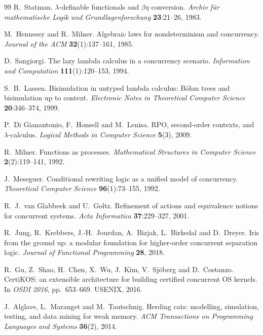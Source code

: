 \documentclass[11pt]{article}
\theoremstyle{plain}
\theoremstyle{definition}
\theoremstyle{remark}
\begin{document}
\begin{thebibliography}{99}
 R.~Statman.
\newblock $\lambda$-definable functionals and $\beta\eta$ conversion.
\newblock \emph{Archiv f\"ur mathematische Logik und Grundlagenforschung}
\textbf{23}:21--26, 1983.

 M.~Hennessy and R.~Milner.
\newblock Algebraic laws for nondeterminism and concurrency.
\newblock \emph{Journal of the ACM} \textbf{32}(1):137--161, 1985.

 D.~Sangiorgi.
\newblock The lazy lambda calculus in a concurrency scenario.
\newblock \emph{Information and Computation} \textbf{111}(1):120--153, 1994.

 S.~B.~Lassen.
\newblock Bisimulation in untyped lambda calculus: B\"ohm trees and
bisimulation up to context.
\newblock \emph{Electronic Notes in Theoretical Computer Science}
\textbf{20}:346--374, 1999.

 P.~Di Gianantonio, F.~Honsell and M.~Lenisa.
\newblock RPO, second-order contexts, and $\lambda$-calculus.
\newblock \emph{Logical Methods in Computer Science} \textbf{5}(3), 2009.

 R.~Milner.
\newblock Functions as processes.
\newblock \emph{Mathematical Structures in Computer Science}
\textbf{2}(2):119--141, 1992.

 J.~Meseguer.
\newblock Conditional rewriting logic as a unified model of concurrency.
\newblock \emph{Theoretical Computer Science} \textbf{96}(1):73--155, 1992.

 R.~J.~van Glabbeek and U.~Goltz.
\newblock Refinement of actions and equivalence notions for concurrent systems.
\newblock \emph{Acta Informatica} \textbf{37}:229--327, 2001.

 R.~Jung, R.~Krebbers, J.-H.~Jourdan, A.~Bizjak, L.~Birkedal and
D.~Dreyer.
\newblock Iris from the ground up: a modular foundation for higher-order
concurrent separation logic.
\newblock \emph{Journal of Functional Programming} \textbf{28}, 2018.

 R.~Gu, Z.~Shao, H.~Chen, X.~Wu, J.~Kim, V.~Sj\"oberg and
D.~Costanzo.
\newblock CertiKOS: an extensible architecture for building certified
concurrent OS kernels.
\newblock In \emph{OSDI 2016}, pp.~653--669. USENIX, 2016.

 J.~Alglave, L.~Maranget and M.~Tautschnig.
\newblock Herding cats: modelling, simulation, testing, and data mining for
weak memory.
\newblock \emph{ACM Transactions on Programming Languages and Systems}
\textbf{36}(2), 2014.


\end{thebibliography}
\end{document}
